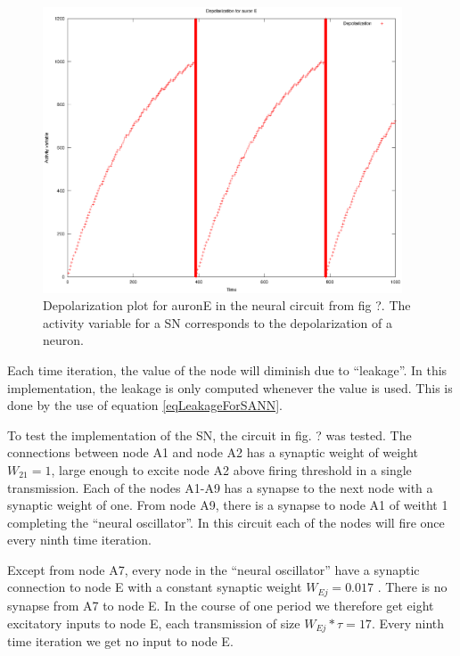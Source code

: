 	\begin{figure}[hb!tp]
		\centering
		\includegraphics[width=0.95\textwidth]{depolPlotAvSN/eps_auronE-depol.eps}
		\caption{Depolarization plot for auronE in the neural circuit from fig ?. The activity variable for a SN corresponds to the depolarization of a neuron.} %
		\label{figAuronE}
	\end{figure}

	Each time iteration, the value of the node will diminish due to ``leakage''. 
	In this implementation, the leakage is only computed whenever the value is used.
	This is done by the use of equation \eqref{eqLeakageForSANN}.

	To test the implementation of the SN, the circuit in fig. ? %
		was tested. The connections between node A1 and node A2 has a synaptic weight of weight $W_{21}=1$, large enough to excite node A2 above firing threshold in a single transmission.
	Each of the nodes A1-A9 has a synapse to the next node with a synaptic weight of one. 
	From node A9, there is a synapse to node A1 of weitht 1 completing the ``neural oscillator''. In this circuit each of the nodes will fire once every ninth time iteration.

	Except from node A7, every node in the ``neural oscillator'' have a synaptic connection to node E with a constant synaptic weight $W_{Ej}=0.017$ . %
	There is no synapse from A7 to node E.
	In the course of one period we therefore get eight excitatory inputs to node E, each transmission of size $W_{Ej}*\tau = 17$. Every ninth time iteration we get no input to node E.

